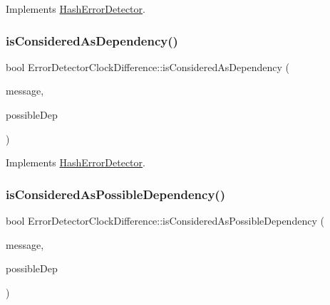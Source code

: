 Implements \hyperlink{classHashErrorDetector_a5b9f7e8a6f63b1582e912102021c2d8d}{Hash\+Error\+Detector}.

\mbox{\label{classErrorDetectorClockDifference_a4d399849b1872d3273fa757ee9dc9bd9}} 
\subsubsection{\texorpdfstring{is\+Considered\+As\+Dependency()}{isConsideredAsDependency()}}
{\footnotesize\ttfamily bool Error\+Detector\+Clock\+Difference\+::is\+Considered\+As\+Dependency (\begin{DoxyParamCaption}\item[{const \hyperlink{structures_8h_a7e7bdc1d2fff8a9436f2f352b2711ed6}{message\+Info} \&}]{message,  }\item[{const \hyperlink{structures_8h_a7e7bdc1d2fff8a9436f2f352b2711ed6}{message\+Info} \&}]{possible\+Dep }\end{DoxyParamCaption})\hspace{0.3cm}{\ttfamily [virtual]}}



Implements \hyperlink{classHashErrorDetector_a4693d4d5e327b19f75088cef52bcad7d}{Hash\+Error\+Detector}.

\mbox{\label{classErrorDetectorClockDifference_ab20aa1671eb558dea6f06b2440e97e41}} 
\subsubsection{\texorpdfstring{is\+Considered\+As\+Possible\+Dependency()}{isConsideredAsPossibleDependency()}}
{\footnotesize\ttfamily bool Error\+Detector\+Clock\+Difference\+::is\+Considered\+As\+Possible\+Dependency (\begin{DoxyParamCaption}\item[{const \hyperlink{structures_8h_a7e7bdc1d2fff8a9436f2f352b2711ed6}{message\+Info} \&}]{message,  }\item[{const \hyperlink{structures_8h_a7e7bdc1d2fff8a9436f2f352b2711ed6}{message\+Info} \&}]{possible\+Dep }\end{DoxyParamCaption})\hspace{0.3cm}{\ttfamily [virtual]}}



